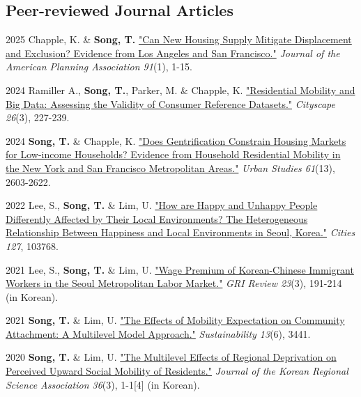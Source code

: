 \documentclass[12pt,letterpaper]{report}
\begin{document}
    \subsection*{Peer-reviewed Journal Articles}
    \begin{tablist}
        \item[2025] \tab{}Chapple, K. \& \textbf{Song, T.} \href{https://doi.org/10.1080/01944363.2024.2319293}{"Can New Housing Supply Mitigate Displacement and Exclusion? Evidence from Los Angeles and San Francisco."} \emph{Journal of the American Planning Association 91}(1), 1-15.
        \item[2024] \tab{}Ramiller A., \textbf{Song, T.}, Parker, M. \& Chapple, K. \href{https://www.jstor.org/stable/48799257}{"Residential Mobility and Big Data: Assessing the Validity of Consumer Reference Datasets."} \emph{Cityscape 26}(3), 227-239.
        \item[2024] \tab{}\textbf{Song, T.} \& Chapple, K. \href{https://doi.org/10.1177/00420980241244699}{"Does Gentrification Constrain Housing Markets for Low-income Households? Evidence from Household Residential Mobility in the New York and San Francisco Metropolitan Areas."} \emph{Urban Studies 61}(13), 2603-2622.
        \item[2022] \tab{}Lee, S., \textbf{Song, T.} \& Lim, U. \href{https://doi.org/10.1016/j.cities.2022.103768}{"How are Happy and Unhappy People Differently Affected by Their Local Environments? The Heterogeneous Relationship Between Happiness and Local Environments in Seoul, Korea."} \emph{Cities 127}, 103768.
        \item[2021] \tab{}Lee, S., \textbf{Song, T.} \& Lim, U. \href{https://www.dbpia.co.kr/Journal/articleDetail?nodeId=NODE11025769}{"Wage Premium of Korean-Chinese Immigrant Workers in the Seoul Metropolitan Labor Market."} \emph{GRI Review 23}(3), 191-214 (in Korean).
        \item[2021] \tab{}\textbf{Song, T.} \& Lim, U. \href{https://www.mdpi.com/2071-1050/13/6/3441}{"The Effects of Mobility Expectation on Community Attachment: A Multilevel Model Approach."} \emph{Sustainability 13}(6), 3441.
        \item[2020] \tab{}\textbf{Song, T.} \& Lim, U. \href{"https://www.koreascience.or.kr/article/JAKO202030161655441.page}{"The Multilevel Effects of Regional Deprivation on Perceived Upward Social Mobility of Residents."} \emph{Journal of the Korean Regional Science Association 36}(3), 1-1[4] (in Korean).
    \end{tablist}
\end{document}
